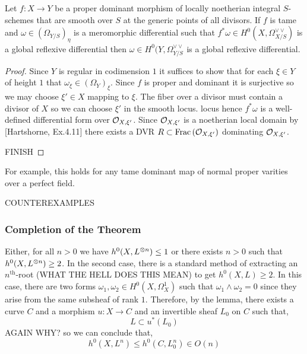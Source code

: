 \documentclass[12pt]{article}
\begin{document}
\begin{prop}
Let $f : X \to Y$ be a proper dominant morphism of locally noetherian integral $S$-schemes that are smooth over $S$ at the generic points of all divisors. If $f$ is tame and $\omega \in (\Omega_{Y/S})_{\eta}$ is a meromorphic differential such that $f^* \omega \in H^0(X, \Omega_{X/S}^{\vee \vee})$ is a global reflexive differential then $\omega \in H^0(Y, \Omega_{Y/S}^{\vee \vee}$ is a global reflexive differential.
\end{prop}

\begin{proof}
Since $Y$ is regular in codimension $1$ it suffices to show that for each $\xi \in Y$ of height $1$ that $\omega_\xi \in (\Omega_Y)_{\xi}$. Since $f$ is proper and dominant it is surjective so we may choose $\xi' \in X$ mapping to $\xi$. The fiber over a divisor must contain a divisor of $X$ so we can choose  $\xi'$ in the smooth locus. locus hence $f^* \omega$ is a well-defined differential form over $\mathcal{O}_{X, \xi'}$.  Since $\mathcal{O}_{X, \xi'}$ is a noetherian local domain by [Hartshorne, Ex.4.11] there exists a DVR $R \subset \mathrm{Frac}\left(\mathcal{O}_{X, \xi'}\right)$ dominating $\mathcal{O}_{X, \xi'}$. 

{\color{red} FINISH}

\end{proof}

\begin{rmk}
For example, this holds for any tame dominant map of normal proper varities over a perfect field. 
\end{rmk}

{\color{red} COUNTEREXAMPLES}


\subsubsection{Completion of the Theorem}

Either, for all $n > 0$ we have $h^0(X, L^{\otimes n}) \le 1$ or there exists $n > 0$ such that $h^0(X, L^{\otimes n}) \ge 2$. In the second case, there is a standard method of extracting an $n^{\text{th}}$-root {\color{red} (WHAT THE HELL DOES THIS MEAN)} to get $h^0(X, L) \ge 2$. In this case, there are two forms $\omega_1, \omega_2 \in H^0(X, \Omega^1_X)$ such that $\omega_1 \wedge \omega_2 = 0$ since they arise from the same subsheaf of rank $1$. Therefore, by the lemma, there exists a curve $C$ and a morphism $u : X \to C$ and an invertible sheaf $L_0$ on $C$ such that,
\[ L \subset u^*(L_0) \]
{\color{red} AGAIN WHY?}
so we can conclude that,
\[ h^0(X, L^n) \le h^0(C, L_0^n) \in O(n) \]
\end{document}
